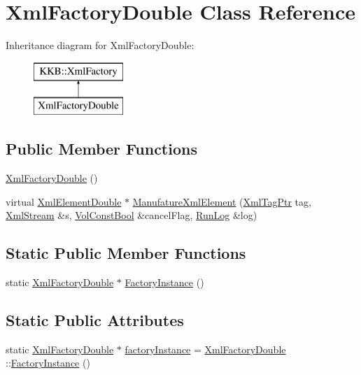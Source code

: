 \hypertarget{class_xml_factory_double}{}\section{Xml\+Factory\+Double Class Reference}
\label{class_xml_factory_double}
Inheritance diagram for Xml\+Factory\+Double\+:\begin{figure}[H]
\begin{center}
\leavevmode
\includegraphics[height=2.000000cm]{class_xml_factory_double}
\end{center}
\end{figure}
\subsection*{Public Member Functions}
\begin{DoxyCompactItemize}
\item 
\hyperlink{class_xml_factory_double_a333c57916e012888196d0f16beb39ea6}{Xml\+Factory\+Double} ()
\item 
virtual \hyperlink{class_k_k_b_1_1_xml_element_double}{Xml\+Element\+Double} $\ast$ \hyperlink{class_xml_factory_double_a00780e24d40d084355393aecaccda6e8}{Manufature\+Xml\+Element} (\hyperlink{namespace_k_k_b_a9253a3ea8a5da18ca82be4ca2b390ef0}{Xml\+Tag\+Ptr} tag, \hyperlink{class_k_k_b_1_1_xml_stream}{Xml\+Stream} \&s, \hyperlink{namespace_k_k_b_a7d390f568e2831fb76b86b56c87bf92f}{Vol\+Const\+Bool} \&cancel\+Flag, \hyperlink{class_k_k_b_1_1_run_log}{Run\+Log} \&log)
\end{DoxyCompactItemize}
\subsection*{Static Public Member Functions}
\begin{DoxyCompactItemize}
\item 
static \hyperlink{class_xml_factory_double}{Xml\+Factory\+Double} $\ast$ \hyperlink{class_xml_factory_double_aff3e3bb183f08ef4856f25445d0242d3}{Factory\+Instance} ()
\end{DoxyCompactItemize}
\subsection*{Static Public Attributes}
\begin{DoxyCompactItemize}
\item 
static \hyperlink{class_xml_factory_double}{Xml\+Factory\+Double} $\ast$ \hyperlink{class_xml_factory_double_ab1f633a37e4484c23d7ffc05c03c8f42}{factory\+Instance} = \hyperlink{class_xml_factory_double}{Xml\+Factory\+Double} \+::\hyperlink{class_xml_factory_double_aff3e3bb183f08ef4856f25445d0242d3}{Factory\+Instance} ()
\end{DoxyCompactItemize}



